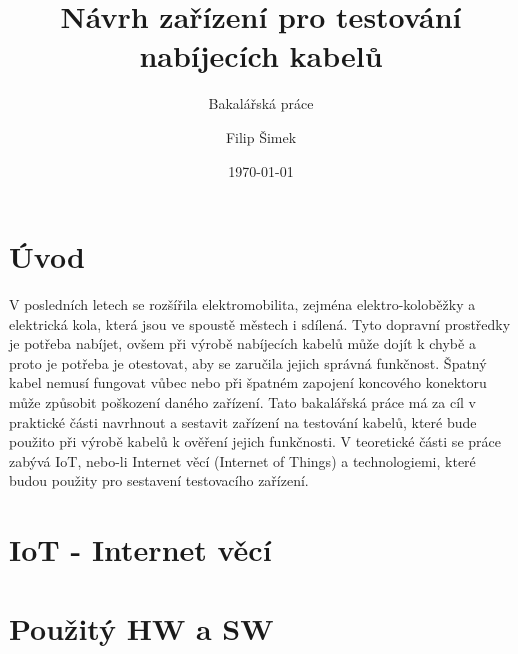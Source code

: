 \documentclass[12pt,a4paper,titlepage]{scrreprt}
\title{\vspace{6cm}Návrh zařízení pro testování nabíjecích kabelů}
\subtitle{Bakalářská práce}
\author{Filip Šimek}
\date{\today}
\begin{document}
	
	
	
	\thispagestyle{empty}
	
	\thispagestyle{empty}
	
	\setcounter{page}{5}
	\newpage
	\thispagestyle{empty}
	
	
	\tableofcontents
	\thispagestyle{empty}
	
	\listoffigures
	\thispagestyle{empty}
	\listoftables
	\thispagestyle{empty}
	
	\chapter{Úvod}
	V posledních letech se rozšířila elektromobilita, zejména elektro-koloběžky a elektrická kola, která jsou ve spoustě městech i sdílená. Tyto dopravní prostředky je potřeba nabíjet, ovšem při výrobě nabíjecích kabelů může dojít k chybě a proto je potřeba je otestovat, aby se zaručila jejich správná funkčnost. Špatný kabel nemusí fungovat vůbec nebo při špatném zapojení koncového konektoru může způsobit poškození daného zařízení. Tato bakalářská práce má za cíl v praktické části navrhnout a sestavit zařízení na testování kabelů, které bude použito při výrobě kabelů k ověření jejich funkčnosti. V teoretické části se práce zabývá IoT, nebo-li Internet věcí (Internet of Things) a technologiemi, které budou použity pro sestavení testovacího zařízení.
	
	\chapter{IoT - Internet věcí}
	
	
	
	\chapter{Použitý HW a SW}
	
	\newpage
	
	\newpage
	
	
\end{document}

